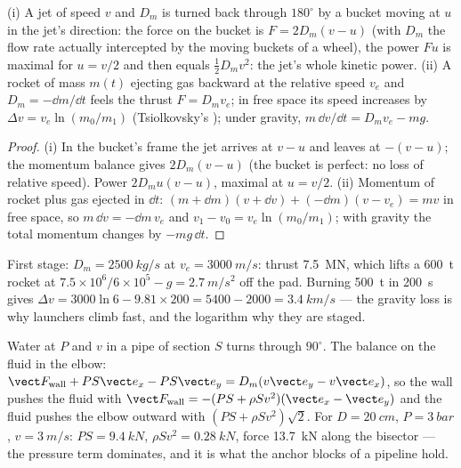 \begin{proposition}\label{prop:b2:flow-balances:pelton}
(i) A jet of speed $v$ and  $D_m$ is turned back through
$180^\circ$ by a bucket moving at $u$ in the jet's direction: the force
on the bucket is $F = 2D_m(v - u)$ (with $D_m$ the flow rate actually
intercepted by the moving buckets of a wheel), the power $Fu$ is
maximal for $u = v/2$ and then equals $\tfrac12D_mv^2$: the jet's whole
kinetic power. (ii) A rocket of mass $m(t)$ ejecting gas backward at
the relative speed $v_e$ and  $D_m = -\dd m/\dd t$ feels the
thrust $F = D_mv_e$; in free space its speed increases by
$\Delta v = v_e\ln(m_0/m_1)$ (Tsiolkovsky's ); under gravity,
$m\,\dd v/\dd t = D_mv_e - mg$.
\end{proposition}

\begin{proof}
(i) In the bucket's frame the jet arrives at $v - u$ and leaves at
$-(v - u)$; the momentum balance gives $2D_m(v - u)$ (the bucket is
perfect: no loss of relative speed). Power $2D_mu(v - u)$, maximal at
$u = v/2$. (ii) Momentum of rocket plus gas ejected in $\dd t$: $(m + \dd m)
(v + \dd v) + (-\dd m)(v - v_e) = mv$ in free space, so $m\,\dd v = -\dd m\,v_e$
and $v_1 - v_0 = v_e\ln(m_0/m_1)$; with gravity the total momentum changes
by $-mg\,\dd t$.
\end{proof}

\begin{example}[A launcher]\label{ex:b2:flow-balances:rocket}
First stage: $D_m = \qty{2500}{kg/s}$ at $v_e = \qty{3000}{m/s}$: thrust
\qty{7.5}{MN}, which lifts a \qty{600}{t} rocket at $7.5 \times 10^6/6 \times 10^5 - g
= \qty{2.7}{m/s^2}$ off the pad. Burning \qty{500}{t} in \qty{200}{s} gives
$\Delta v = 3000\ln6 - 9.81 \times 200 = 5400 - 2000 = \qty{3.4}{km/s}$ --- the
gravity loss is why launchers climb fast, and the logarithm why they
are staged.
\end{example}

\begin{example}\label{ex:b2:flow-balances:bend}
Water at $P$ and $v$ in a pipe of section $S$ turns through $90^\circ$. The
balance on the fluid in the elbow: $\vect F_{\text{wall}} + PS\vect e_x - PS
\vect e_y = D_m(v\vect e_y - v\vect e_x)$, so the wall pushes the fluid with
$\vect F_{\text{wall}} = -(PS + \rho Sv^2)(\vect e_x - \vect e_y)$ and the fluid
pushes the elbow outward with $(PS + \rho Sv^2)\sqrt2$. For $D = \qty{20}{cm}$,
$P = \qty{3}{bar}$, $v = \qty{3}{m/s}$: $PS = \qty{9.4}{kN}$, $\rho Sv^2 = \qty{0.28}{kN}$,
force \qty{13.7}{kN} along the bisector --- the pressure term dominates,
and it is what the anchor blocks of a pipeline hold.
\end{example}


